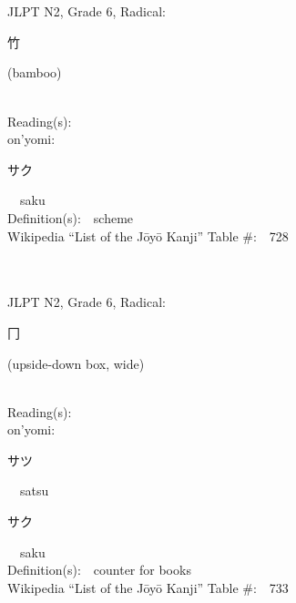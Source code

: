 \begin{multicols}{2}
\ \ \\
{\fontsize{34pt}{40pt}  }\ \ \\  %
{JLPT N2, Grade 6, Radical:\ \ {\begin{CJK}{UTF8}{min} 竹 \end{CJK}} (bamboo) } \\
Reading(s):\ \ \\
{\hspace*{1em}}on'yomi:\ \ \\
{\hspace*{2em}}{\begin{CJK}{UTF8}{min} サク \end{CJK}}\ \ saku\ \ \\
Definition(s):\ \ scheme \\
Wikipedia ``List of the J\=oy\=o Kanji'' Table \#:\ \ 728 \\
\ \ \\
{\fontsize{34pt}{40pt}  }\ \ \\  %
{JLPT N2, Grade 6, Radical:\ \ {\begin{CJK}{UTF8}{min} 冂 \end{CJK}} (upside-down box, wide) } \\
Reading(s):\ \ \\
{\hspace*{1em}}on'yomi:\ \ \\
{\hspace*{2em}}{\begin{CJK}{UTF8}{min} サツ \end{CJK}}\ \ satsu\ \ \\
{\hspace*{2em}}{\begin{CJK}{UTF8}{min} サク \end{CJK}}\ \ saku\ \ \\
Definition(s):\ \ counter for books \\
Wikipedia ``List of the J\=oy\=o Kanji'' Table \#:\ \ 733 \\
\ \ \\
{\fontsize{34pt}{40pt}  }\ \ \\  %

\end{multicols}
